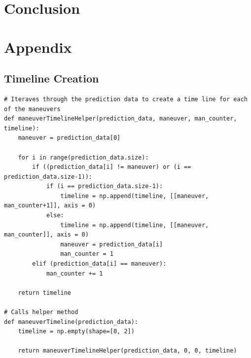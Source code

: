 \documentclass{article}
\begin{document}
\section{Conclusion}


\appendix
\section{Appendix}
\subsection{Timeline Creation}
\label{sec:timeline}
\begin{lstlisting}
# Iteraves through the prediction data to create a time line for each of the maneuvers
def maneuverTimelineHelper(prediction_data, maneuver, man_counter, timeline):
	maneuver = prediction_data[0]

	for i in range(prediction_data.size):
		if ((prediction_data[i] != maneuver) or (i == prediction_data.size-1)):
			if (i == prediction_data.size-1):
				timeline = np.append(timeline, [[maneuver, man_counter+1]], axis = 0)
			else:
				timeline = np.append(timeline, [[maneuver, man_counter]], axis = 0)
				maneuver = prediction_data[i]
				man_counter = 1
		elif (prediction_data[i] == maneuver):
			man_counter += 1

	return timeline

# Calls helper method
def maneuverTimeline(prediction_data):
	timeline = np.empty(shape=[0, 2])

	return maneuverTimelineHelper(prediction_data, 0, 0, timeline)
\end{lstlisting}
\end{document}
